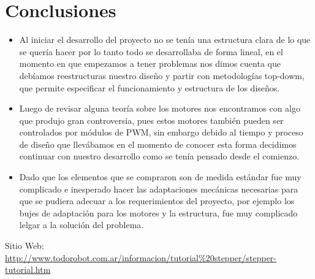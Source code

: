 \documentclass[twocolumn]{IEEEtran}
\begin{document}
\section{Conclusiones}
\begin{itemize}
 \item Al iniciar el desarrollo del proyecto no se tenía una estructura clara de lo que se quería hacer por lo tanto todo se desarrollaba de forma lineal, en el momento en que empezamos a tener problemas nos dimos cuenta que debíamos reestructuras nuestro diseño y partir con metodologías top-dowm, que  permite  especificar el funcionamiento y estructura de los diseños.
 \item Luego de revisar alguna teoría sobre los motores nos encontramos con algo que produjo gran controversia, pues estos motores también pueden ser controlados por módulos de PWM, sin embargo debido al tiempo y proceso de diseño que llevábamos en el momento de conocer esta forma decidimos continuar con nuestro desarrollo como se tenía pensado desde el comienzo.
 \item Dado que los elementos que se compraron son de medida estándar fue muy complicado e inesperado hacer las adaptaciones mecánicas necesarias para que se pudiera adecuar a los requerimientos del proyecto, por ejemplo los bujes de adaptación para los motores y la estructura, fue muy complicado lelgar a la solución del problema.
\end{itemize}

\begin{thebibliography}{99}
 Sitio Web: \url{http://www.todorobot.com.ar/informacion/tutorial%20stepper/stepper-tutorial.htm}
\end{thebibliography}
\end{document}
